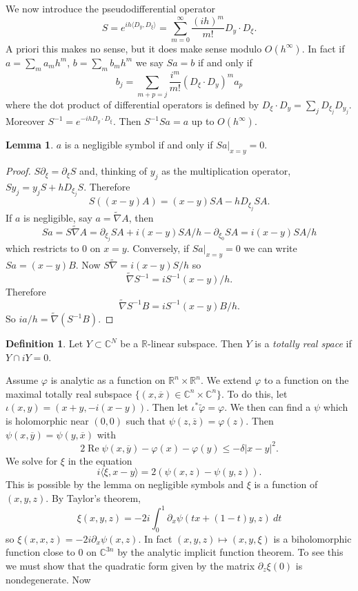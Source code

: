 \documentclass[12pt]{report}
\newcommand{\RR}{\mathbb{R}}
\newcommand{\CC}{\mathbb{C}}
\renewcommand{\Re}{\operatorname{Re}}
\newcommand{\dfn}[1]{\emph{#1}\index{#1}}
\theoremstyle{definition}
\newtheorem{lemma}[theorem]{Lemma}
\newtheorem{definition}[theorem]{Definition}
\begin{document}
    We now introduce the pseudodifferential operator
    $$S = e^{ih\langle D_y, D_\xi\rangle} = \sum_{m=0}^\infty \frac{(ih)^m}{m!} D_y \cdot D_\xi.$$
    A priori this makes no sense, but it does make sense modulo $O(h^\infty)$. In fact if $a = \sum_m a_m h^m$, $b = \sum_m b_m h^m$ we say $Sa = b$ if and only if
    $$b_j = \sum_{m+p = j} \frac{i^m}{m!}(D_\xi \cdot D_y)^m a_p$$
    where the dot product of differential operators is defined by $D_\xi \cdot D_y = \sum_j D_{\xi_j}D_{y_j}$. Moreover $S^{-1} = e^{-ihD_y\cdot D_\xi}$. Then $S^{-1}Sa = a$ up to $O(h^\infty)$.
\begin{lemma}
    $a$ is a negligible symbol if and only if $Sa|_{x = y} = 0$.
\end{lemma}
\begin{proof}
    $S\partial_\xi = \partial_\xi S$ and, thinking of $y_j$ as the multiplication operator, $Sy_j = y_jS + hD_{\xi_j}S$. Therefore
    $$S((x-y)A) = (x-y)SA - hD_{\xi_j}SA.$$
    If $a$ is negligible, say $a = \tilde \nabla A$, then
    $$Sa = S\tilde \nabla A = \partial_{\xi_j}SA + i(x-y)SA/h - \partial_{\xi_0}SA = i(x-y)SA/h$$
    which restricts to $0$ on $x=y$. Conversely, if $Sa|_{x=y} = 0$ we can write $Sa = (x-y)B$. Now $S\tilde \nabla = i(x-y)S/h$ so
    $$\tilde \nabla S^{-1} = iS^{-1}(x-y)/h.$$
    Therefore
    $$\tilde \nabla S^{-1}B = iS^{-1}(x-y)B/h.$$
    So $ia/h = \tilde \nabla(S^{-1}B)$.
\end{proof}
\begin{definition}
    Let $Y \subset \CC^N$ be a $\RR$-linear subspace. Then $Y$ is a \dfn{totally real space} if $Y \cap iY = 0$.
\end{definition}
    Assume $\varphi$ is analytic as a function on $\RR^n \times \RR^n$. We extend $\varphi$ to a function on the maximal totally real subspace $\{(x, \overline x) \in \CC^n \times \CC^n\}$. To do this, let $\iota(x, y) = (x + y, -i(x - y))$. Then let $\iota^*\tilde \varphi = \varphi$. We then can find a $\psi$ which is holomorphic near $(0, 0)$ such that $\psi(z, \overline z) = \varphi(z)$. Then $\psi(x, \overline y) = \psi(y, \overline x)$ with
    $$2 \Re \psi(x, \overline y) - \varphi(x) - \varphi(y) \leq -\delta|x - y|^2.$$
    We solve for $\xi$ in the equation
    $$i\langle \xi, x - y\rangle = 2(\psi(x, z) - \psi(y, z)).$$
    This is possible by the lemma on negligible symbols and $\xi$ is a function of $(x, y, z)$. By Taylor's theorem,
    $$\xi(x, y, z) = -2i\int_0^1 \partial_x \psi(tx + (1-t)y, z) ~dt$$
    so $\xi(x, x, z) = -2i\partial_x \psi(x, z)$. In fact $(x, y, z) \mapsto (x, y, \xi)$ is a biholomorphic function close to $0$ on $\CC^{3n}$ by the analytic implicit function theorem. To see this we must show that the quadratic form given by the matrix $\partial_z \xi(0)$ is nondegenerate. Now
\end{document}
